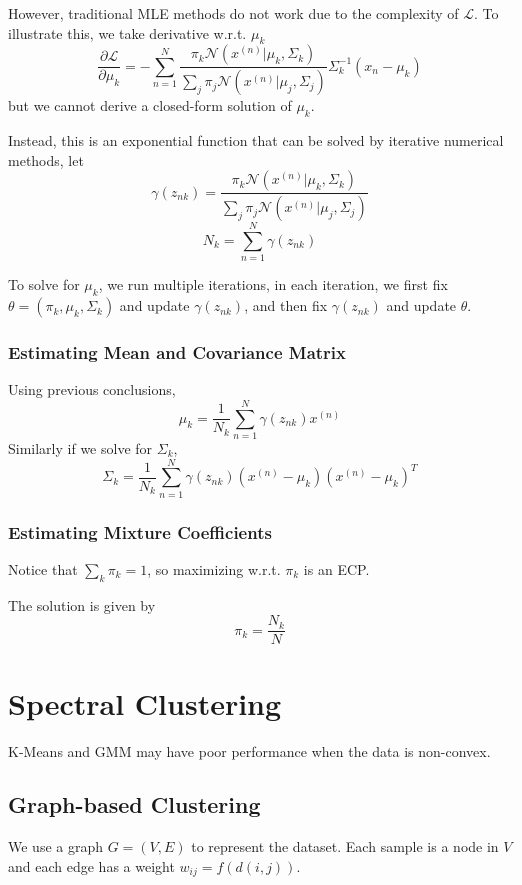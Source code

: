         However, traditional MLE methods do not work due to the complexity of $\mathcal{L}$. To illustrate this, we take derivative w.r.t. $\mu_k$
        \[ \frac{\partial \mathcal{L}}{\partial \mu_k} = -\sum_{n=1}^N\frac{\pi_k\mathcal{N}(x^{(n)}|\mu_k,\Sigma_k)}{\sum_j\pi_j\mathcal{N}(x^{(n)}|\mu_j,\Sigma_j)}\Sigma_k^{-1}(x_n-\mu_k) \]
        but we cannot derive a closed-form solution of $\mu_k$.

        Instead, this is an exponential function that can be solved by iterative numerical methods, let
        \[ \gamma(z_{nk}) = \frac{\pi_k\mathcal{N}(x^{(n)}|\mu_k,\Sigma_k)}{\sum_j\pi_j\mathcal{N}(x^{(n)}|\mu_j,\Sigma_j)} \]
        \[ N_k = \sum_{n=1}^N \gamma(z_{nk}) \]

        To solve for $\mu_k$, we run multiple iterations, in each iteration, we first fix $\theta = (\pi_k,\mu_k,\Sigma_k)$ and update $\gamma(z_{nk})$, and then fix $\gamma(z_{nk})$ and update $\theta$.

        \subsubsection{Estimating Mean and Covariance Matrix}
        Using previous conclusions,
        \[ \mu_k = \frac{1}{N_k}\sum_{n=1}^N\gamma(z_{nk})x^{(n)} \]
        Similarly if we solve for $\Sigma_k$,
        \[ \Sigma_k = \frac{1}{N_k}\sum_{n=1}^N\gamma(z_{nk})(x^{(n)}-\mu_k)(x^{(n)}-\mu_k)^T \]

        \subsubsection{Estimating Mixture Coefficients}
        Notice that $\sum_k\pi_k = 1$, so maximizing w.r.t. $\pi_k$ is an ECP.

        The solution is given by
        \[ \pi_k = \frac{N_k}{N} \]

    
\section{Spectral Clustering}
    K-Means and GMM may have poor performance when the data is non-convex.
    
    \subsection{Graph-based Clustering}
        We use a graph $G=(V,E)$ to represent the dataset. Each sample is a node in $V$ and each edge has a weight $w_{ij}=f(d(i,j))$.

